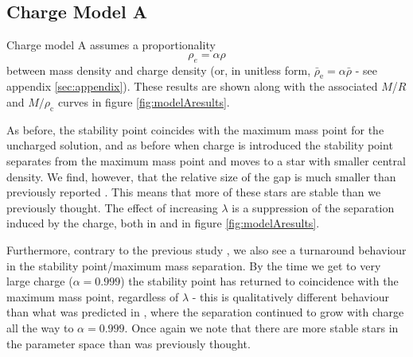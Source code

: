 \documentclass[12pt,noshowpacs,nofootinbib,notitlepage,amsmath,superscriptaddress]{revtex4-1}%
\begin{document}
 \subsection{Charge Model A}\label{sec:modelAplus}
 Charge model A assumes a proportionality
 $$
 \rho_e=\alpha\rho
 $$
 between mass density and charge density \cite{zhang:2021,Goncalves:2020joq,Ray:2003gt,panotopoulos2019} (or, in unitless form, $\bar{\rho}_\mathrm{e}=\alpha \bar{\rho}$ - see appendix \ref{sec:appendix}). These results are shown along with the associated $M$/$R$ and $M/\rho_\mathrm{c}$ curves in figure \ref{fig:modelAresults}. 

 

 
 As before, the stability point coincides with the maximum mass point for the uncharged solution, and as before when charge is introduced the stability point separates from the maximum mass point and moves to a star with smaller central density. 
We find, however, that the relative size of the gap  is much smaller than previously reported
\cite{zhang:2021}. This means that more of these stars are stable than we previously thought. The effect of increasing $\lambda$ is a suppression of the separation induced by the charge, both in \cite{zhang:2021} and in figure \ref{fig:modelAresults}. 
 
Furthermore, contrary to the previous study \cite{zhang:2021}, we also see a turnaround behaviour in the stability point/maximum mass separation. By the time we get to very large charge ($\alpha=0.999$) the stability point has returned to coincidence with the maximum mass point, regardless of $\lambda$ - this is qualitatively different behaviour than what was predicted in \cite{zhang:2021}, where the separation continued to grow with charge all the way to $\alpha=0.999$. Once again we note that there are more stable stars in the parameter space than was previously thought.
 
\end{document}
